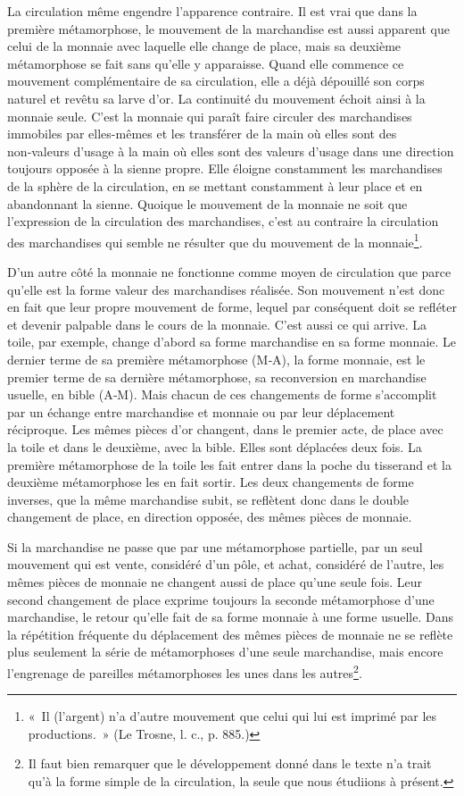 \documentclass[french,twoside]{book} %
\begin{document}
La circulation même engendre l’apparence contraire. Il est vrai que dans la première métamorphose, le mouvement de la marchandise est aussi apparent que celui de la monnaie avec laquelle elle change de place, mais sa deuxième métamorphose se fait sans qu’elle y apparaisse. Quand elle commence ce mouvement complémentaire de sa circulation, elle a déjà dépouillé son corps naturel et revêtu sa larve d’or. La continuité du mouvement échoit ainsi à la monnaie seule. C’est la monnaie qui paraît faire circuler des marchandises immobiles par elles-mêmes et les transférer de la main où elles sont des non‑valeurs d’usage à la main où elles sont des valeurs d’usage dans une direction toujours opposée à la sienne propre. Elle éloigne constamment les marchandises de la sphère de la circulation, en se mettant constamment à leur place et en abandonnant la sienne. Quoique le mouvement de la monnaie ne soit que l’expression de la circulation des marchandises, c’est au contraire la circulation des marchandises qui semble ne résulter que du mouvement de la monnaie\footnote{« Il (l’argent) n’a d’autre mouvement que celui qui lui est imprimé par les productions. » (Le Trosne, l. c., p. 885.)}.\par
D’un autre côté la monnaie ne fonctionne comme moyen de circulation que parce qu’elle est la forme valeur des marchandises réalisée. Son mouvement n’est donc en fait que leur propre mouvement de forme, lequel par conséquent doit se refléter et devenir palpable dans le cours de la monnaie. C’est aussi ce qui arrive. La toile, par exemple, change d’abord sa forme marchandise en sa forme monnaie. Le dernier terme de sa première métamorphose (M‑A), la forme monnaie, est le premier terme de sa dernière métamorphose, sa reconversion en marchandise usuelle, en bible (A‑M). Mais chacun de ces changements de forme s’accomplit par un échange entre marchandise et monnaie ou par leur déplacement réciproque. Les mêmes pièces d’or changent, dans le premier acte, de place avec la toile et dans le deuxième, avec la bible. Elles sont déplacées deux fois. La première métamorphose de la toile les fait entrer dans la poche du tisserand et la deuxième métamorphose les en fait sortir. Les deux changements de forme inverses, que la même marchandise subit, se reflètent donc dans le double changement de place, en direction opposée, des mêmes pièces de monnaie.\par
Si la marchandise ne passe que par une métamorphose partielle, par un seul mouvement qui est vente, considéré d’un pôle, et achat, considéré de l’autre, les mêmes pièces de monnaie ne changent aussi de place qu’une seule fois. Leur second changement de place exprime toujours la seconde métamorphose d’une marchandise, le retour qu’elle fait de sa forme monnaie à une forme usuelle. Dans la répétition fréquente du déplacement des mêmes pièces de monnaie ne se reflète plus seulement la série de métamorphoses d’une seule marchandise, mais encore l’engrenage de pareilles métamorphoses les unes dans les autres\footnote{Il faut bien remarquer que le développement donné dans le texte n’a trait qu’à la forme simple de la circulation, la seule que nous étudiions à présent.}.\par
\end{document}
